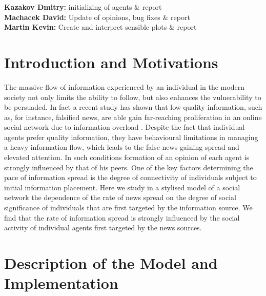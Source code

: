 \documentclass[11pt]{article}
\begin{document}
\textbf{Kazakov Dmitry:} initializing of agents \& report
\\

\textbf{Machacek David:} Update of opinions, bug fixes \& report
\\

\textbf{Martin Kevin:} Create and interpret sensible plots \& report

\section{Introduction and Motivations}

The massive flow of information experienced by an individual in the modern society not only limits the ability to follow, but also enhances the vulnerability to be persuaded. In fact a recent study has shown that low-quality information, such as, for instance, falsified news, are able gain far-reaching proliferation in an online social network due to information overload \cite{NHB1}. Despite the fact that individual agents prefer quality information, they have behavioural limitations in managing a heavy information flow, which leads to the false news gaining spread and elevated attention. In such conditions formation of an opinion of each agent is strongly influenced by that of his peers. One of the key factors determining the pace of information spread is the degree of connectivity of individuals subject to initial information placement. Here we study in a stylised model of a social network the dependence of the rate of news spread on the degree of social significance of individuals that are first targeted by the information source. We find that the rate of information spread is strongly influenced by the social activity of individual agents first targeted by the news sources. 

\section{Description of the Model and Implementation}
\end{document}
